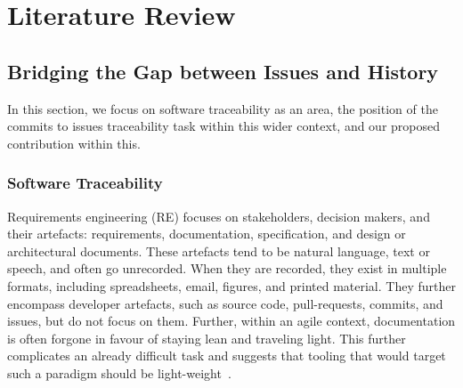 \chapter{Literature Review}
\label{chapter:literature}

\section{Bridging the Gap between Issues and History}
\label{chapter:literature:sec:am_rel_work}

In this section, we focus on software traceability as an area, the
position of the commits to issues traceability task within this wider context,
and our proposed contribution within this.

\subsection{Software Traceability}
\label{chapter:literature:sec:am_rel_work:tracability}

Requirements engineering (RE) focuses on stakeholders, decision makers, and
their artefacts: requirements, documentation, specification, and design or
architectural documents. These artefacts tend to be natural language, text or
speech, and often go unrecorded. When they are recorded, they exist in multiple
formats, including spreadsheets, email, figures, and printed material. They
further encompass developer artefacts, such as source code, pull-requests,
commits, and issues, but do not focus on them. Further, within an agile context,
documentation is often forgone in favour of staying lean and traveling light.
This further complicates an already difficult task and suggests that tooling
that would target such a paradigm should be light-weight~\cite{Stahl2017}.


